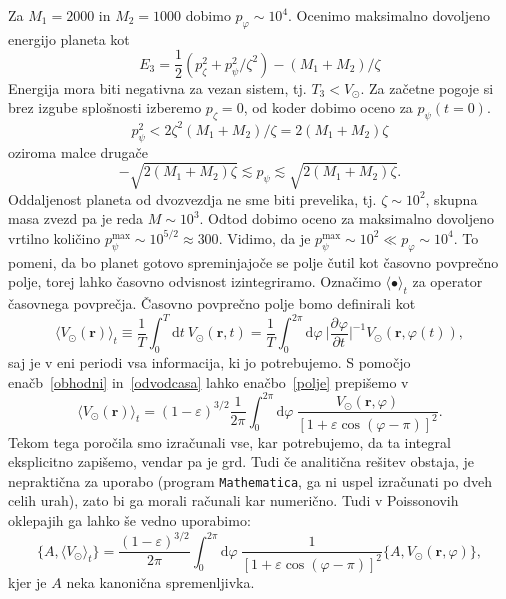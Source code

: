 \documentclass[12pt, a4paper]{article}
\renewcommand{\r}{
    \ensuremath{\mathbf{r}}
}
\newcommand{\der}[3][]{
    \ensuremath{ \frac{\partial^{#1} #2}{\partial #3^{#1}} }
}
\renewcommand{\d}{
    \ensuremath{\mathrm{d}}
}
\begin{document}
Za $M_1 = 2000$ in $M_2 = 1000$ dobimo $p_\varphi \sim 10^4$. Ocenimo maksimalno dovoljeno energijo
planeta kot
\begin{equation}
	E_3 = \frac{1}{2}(p^2_\zeta + p_\psi^2/\zeta^2) - (M_1 + M_2)/\zeta
\end{equation}
Energija mora biti negativna za vezan sistem, tj. $T_3 < V_\odot$. Za za\v cetne pogoje si brez izgube
splo\v snosti izberemo $p_\zeta = 0$, od koder dobimo oceno za $p_\psi(t = 0)$.
\[
	p_\psi^2 < 2\zeta^2 (M_1 + M_2)/\zeta = 2(M_1 + M_2)\zeta
\]
oziroma malce druga\v ce
\begin{equation}
	-\sqrt{2(M_1 + M_2)\zeta} \lesssim p_\psi \lesssim \sqrt{2(M_1 + M_2)\zeta}.
\end{equation}
Oddaljenost planeta od dvozvezdja ne sme biti prevelika, tj. $\zeta \sim 10^2$, skupna masa zvezd pa je
reda $M \sim 10^3$. Odtod dobimo oceno za maksimalno dovoljeno vrtilno koli\v cino $p_\psi^\text{max}
\sim 10^{5/2} \approx 300$. Vidimo, da je $p_\psi^\text{max} \sim 10^2 \ll p_\varphi \sim 10^4$. To pomeni,
da bo planet gotovo spreminjajo\v ce se polje \v cutil kot \v casovno povpre\v cno polje, torej lahko
\v casovno odvisnost izintegriramo. Ozna\v cimo $\langle \bullet \rangle_t$ za operator \v casovnega povpre\v cja.
\v Casovno povpre\v cno polje bomo definirali kot
\begin{equation}
	\langle V_\odot(\r)\rangle_t \equiv \frac{1}{T}\int_0^T \d t\ V_\odot (\r,t) = \frac{1}{T}\int_0^{2\pi}\d \varphi\
		\bigg|\der{\varphi}{t}\bigg|^{-1} V_\odot(\r, \varphi(t)),
	\label{polje}
\end{equation}
saj je v eni periodi vsa informacija, ki jo potrebujemo. S pomo\v cjo ena\v cb~\eqref{obhodni} in~\eqref{odvodcasa}
lahko ena\v cbo~\eqref{polje} prepi\v semo v
\begin{equation}
	\langle V_\odot(\r)\rangle_t = (1 - \varepsilon)^{3/2} \frac{1}{2\pi}\int_0^{2\pi} \d \varphi\
		\frac{V_\odot(\r,\varphi)}{[1 + \varepsilon\cos(\varphi - \pi)]^2}.
\end{equation}
Tekom tega poro\v cila smo izra\v cunali vse, kar potrebujemo, da ta integral eksplicitno zapi\v semo, vendar
pa je grd. Tudi \v ce analiti\v cna re\v sitev obstaja, je neprakti\v cna za uporabo (program {\tt Mathematica},
ga ni uspel izra\v cunati po dveh celih urah), zato bi ga morali ra\v cunali kar numeri\v cno. Tudi v Poissonovih
oklepajih ga lahko \v se vedno uporabimo:
\begin{equation}
	\big\{A,\langle V_\odot\rangle_t\big\} = \frac{(1 - \varepsilon)^{3/2}}{2\pi}\int_0^{2\pi}\d \varphi\
		\frac{1}{[1 + \varepsilon\cos(\varphi - \pi)]^2}\{A, V_\odot(\r,\varphi)\},
\end{equation}
kjer je $A$ neka kanoni\v cna spremenljivka. 
\end{document}
